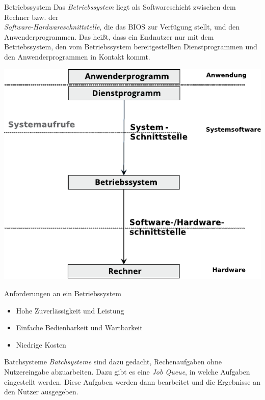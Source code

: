\documentclass[german]{spicker}
\begin{document}
\begin{defi}{Betriebssystem}
    Das \emph{Betriebssystem} liegt als Softwareschicht zwischen dem Rechner bzw. der \\ \emph{Software-Hardwareschnittstelle}, die das BIOS zur Verfügung stellt, und den Anwenderprogrammen.
    Das heißt, dass ein Endnutzer nur mit dem Betriebssystem, den vom Betriebssystem bereitgestellten Dienstprogrammen und den Anwenderprogrammen in Kontakt kommt.

    \begin{center}
        \includegraphics[]{images/betriebssysteme.pdf}
    \end{center}
\end{defi}

\begin{bonus}{Anforderungen an ein Betriebssystem}
    \begin{itemize}
        \item Hohe Zuverlässigkeit und Leistung
        \item Einfache Bedienbarkeit und Wartbarkeit
        \item Niedrige Kosten
    \end{itemize}
\end{bonus}

\begin{bonus}{Batchsysteme}
    \emph{Batchsysteme} sind dazu gedacht, Rechenaufgaben ohne Nutzereingabe abzuarbeiten.
    Dazu gibt es eine \emph{Job Queue}, in welche Aufgaben eingestellt werden.
    Diese Aufgaben werden dann bearbeitet und die Ergebnisse an den Nutzer ausgegeben.
\end{bonus}
\end{document}
